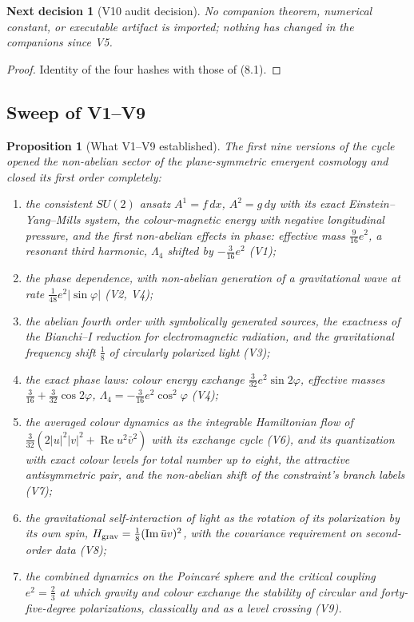 \documentclass[11pt]{article}
\newtheorem{proposition}[theorem]{Proposition}
\newtheorem{decision}[theorem]{Next decision}
\theoremstyle{remark}
\begin{document}
\begin{decision}[V10 audit decision]
\label{dec:v20v10-audit}
No companion theorem, numerical constant, or executable artifact is
imported; nothing has changed in the companions since V5.
\end{decision}

\begin{proof}
Identity of the four hashes with those of (8.1).
\end{proof}

\subsection{Sweep of V1--V9}

\begin{proposition}[What V1--V9 established]
\label{prop:v20v10-sweep}
The first nine versions of the cycle opened the non-abelian sector of
the plane-symmetric emergent cosmology and closed its first order
completely:

\begin{enumerate}
\item the consistent \(SU(2)\) ansatz \(A^1=f\,dx\), \(A^2=g\,dy\) with
its exact Einstein--Yang--Mills system, the colour-magnetic energy
with negative longitudinal pressure, and the first non-abelian effects
in phase: effective mass \(\tfrac9{16}e^2\), a resonant third
harmonic, \(\Lambda_4\) shifted by \(-\tfrac3{16}e^2\) (V1);
\item the phase dependence, with non-abelian generation of a
gravitational wave at rate \(\tfrac1{48}e^2|\sin\varphi|\) (V2, V4);
\item the abelian fourth order with symbolically generated sources,
the exactness of the Bianchi--I reduction for electromagnetic
radiation, and the gravitational frequency shift \(\tfrac18\) of
circularly polarized light (V3);
\item the exact phase laws: colour energy exchange
\(\tfrac3{32}e^2\sin2\varphi\), effective masses
\(\tfrac3{16}+\tfrac3{32}\cos2\varphi\), \(\Lambda_4=-\tfrac3{16}e^2\cos^2\varphi\)
(V4);
\item the averaged colour dynamics as the integrable Hamiltonian flow
of \(\tfrac3{32}(2|u|^2|v|^2+\operatorname{Re}u^2\bar v^2)\) with its
exchange cycle (V6), and its quantization with exact colour levels for
total number up to eight, the attractive antisymmetric pair, and the
non-abelian shift of the constraint's branch labels (V7);
\item the gravitational self-interaction of light as the rotation of
its polarization by its own spin, \(H_{\rm grav}=\tfrac18(\operatorname{Im}\bar uv)^2\),
with the covariance requirement on second-order data (V8);
\item the combined dynamics on the Poincar\'e sphere and the critical
coupling \(e^2=\tfrac23\) at which gravity and colour exchange the
stability of circular and forty-five-degree polarizations, classically
and as a level crossing (V9).
\end{enumerate}
\end{proposition}
\end{document}
